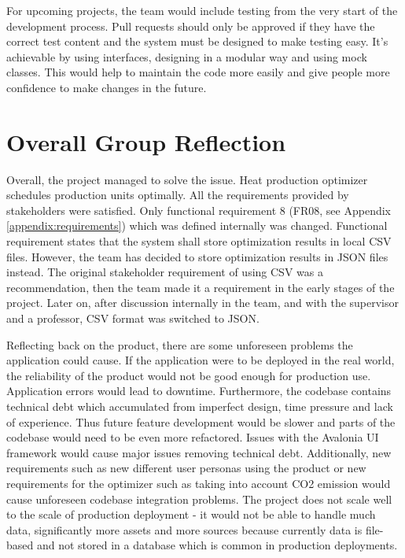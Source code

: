 For upcoming projects, the team would include testing from the very start of the development process. Pull requests should only be approved if they have the correct test content and the system must be designed to make testing easy. It's achievable by using interfaces, designing in a modular way and using mock classes. This would help to maintain the code more easily and give people more confidence to make changes in the future.\par

\section{Overall Group Reflection}
Overall, the project managed to solve the issue. Heat production optimizer schedules production units optimally. All the requirements provided by stakeholders were satisfied. Only functional requirement 8 (FR08, see Appendix \ref{appendix:requirements}) which was defined internally was changed. Functional requirement states that the system shall store optimization results in local CSV files. However, the team has decided to store optimization results in JSON files instead. The original stakeholder requirement of using CSV was a recommendation, then the team made it a requirement in the early stages of the project. Later on, after discussion internally in the team, and with the supervisor and a professor, CSV format was switched to JSON.\par
Reflecting back on the product, there are some unforeseen problems the application could cause. If the application were to be deployed in the real world, the reliability of the product would not be good enough for production use. Application errors would lead to downtime. Furthermore, the codebase contains technical debt which accumulated from imperfect design, time pressure and lack of experience. Thus future feature development would be slower and parts of the codebase would need to be even more refactored. Issues with the Avalonia UI framework would cause major issues removing technical debt. Additionally, new requirements such as new different user personas using the product or new requirements for the optimizer such as taking into account CO2 emission would cause unforeseen codebase integration problems. The project does not scale well to the scale of production deployment - it would not be able to handle much data, significantly more assets and more sources because currently data is file-based and not stored in a database which is common in production deployments.\par
